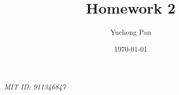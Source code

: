 \documentclass[letterpaper, reqno,11pt]{article}
\begin{document}
\title{Homework 2}
\author{Yuchong Pan}
\date{\today}
\newtheorem{theorem}{Theorem}
\newtheorem{lemma}[theorem]{Lemma}
\newtheorem{corollary}[theorem]{Corollary}
\newtheorem{fact}[theorem]{Fact}
\newtheorem{claim}{Claim}
\newtheorem{exercise}{Exercise}
\theoremstyle{definition}
\newtheorem{definition}[theorem]{Definition}
\newtheorem{solution}{Solution}
%

\begin{framed}
 \hfill \thedate
\begin{center}
\Large{\thetitle}
\end{center}
 \hfill {\em MIT ID: 911346847}
\end{framed}
\end{document}
